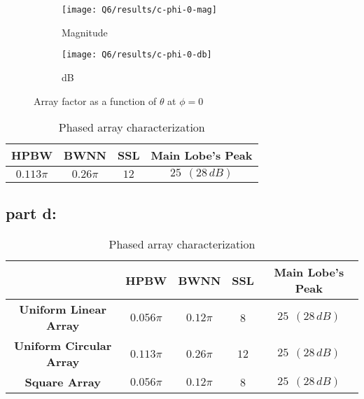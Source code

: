 \documentclass[12pt,onecolumn,a4paper]{article}
\begin{document}
\begin{figure}[H]
	\centering
	\begin{subfigure}{\linewidth}
		\centering
		\texttt{[image: Q6/results/c-phi-0-mag]}
		\caption{Magnitude}
		\label{fig:c-phi-0-mag}
	\end{subfigure}
	
	\begin{subfigure}{\linewidth}
		\centering
		\texttt{[image: Q6/results/c-phi-0-db]}
		\caption{dB}
		\label{fig:c-phi-0-db}
	\end{subfigure}
	\caption{Array factor as a function of $\theta$ at $\phi=0$}
\end{figure}

\begin{table}[H]
	\centering
	\caption{Phased array characterization}
	\begin{tabular}{cccc}
		\toprule
		\textbf{HPBW} & \textbf{BWNN} & \textbf{SSL} & \textbf{Main Lobe's Peak}\\
		\midrule
		$0.113\pi$ & $0.26\pi$ & $12$ & $25 \ \ (28\,dB)$\\
		\bottomrule
	\end{tabular}
\end{table}


\subsection{part d:}


\begin{table}[H]
	\centering
	\caption{Phased array characterization}
	\begin{tabular}{ccccc}
		\toprule
		\textbf{} & \textbf{HPBW} & \textbf{BWNN} & \textbf{SSL} & \textbf{Main Lobe's Peak}\\
		\midrule
		\textbf{Uniform Linear Array} & $0.056\pi$ & $0.12\pi$ & 8 & $25 \ \ (28\,dB)$\\
		\midrule
		\textbf{Uniform Circular Array} & $0.113\pi$ & $0.26\pi$ & $12$ & $25 \ \ (28\,dB)$\\
		\midrule
		\textbf{Square Array} & $0.056\pi$ & $0.12\pi$ & 8 & $25 \ \ (28\,dB)$\\
		\bottomrule
	\end{tabular}
\end{table}


	
	\newpage
	
	
	
\end{document}
